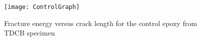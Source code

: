 \documentclass[numbers=noendperiod,chapterprefix=on]{icldt} %
\begin{document}


%

\begin{figure}[!htpb]
\centering
\texttt{[image: ControlGraph]}
\caption{Fracture energy versus crack length for the control epoxy from TDCB specimen} %
\end{figure}
\FloatBarrier
\end{document}
